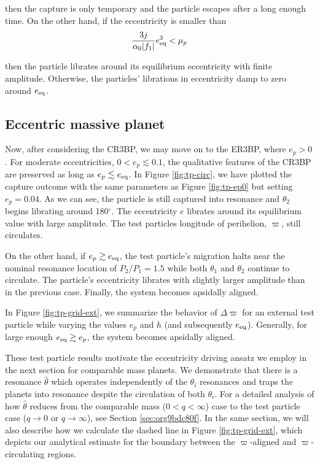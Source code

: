\documentclass[usenatbib,twocolumn]{mnras}
\DeclarePairedDelimiter{\abs}{|}{|}
\begin{document}
\noindent
then the capture is only temporary and the particle escapes after a
long enough time. On the other hand, if the eccentricity is smaller
than
\begin{equation}
  \frac{3j}{\alpha_0 \abs{f_1}}e_{\rm eq}^3 < \mu_p
\end{equation}

\noindent
then the particle librates around its equilibrium eccentricity with
finite amplitude. Otherwise, the particles' librations in eccentricity
damp to zero around \(e_{\rm eq}\).


\subsection{Eccentric massive planet}
\label{sec:orgeb5821c}
Now, after considering the
CR3BP, we may move on to the ER3BP, where \(e_p>0\).  For moderate
eccentricities, \(0<e_p\lesssim 0.1\), the qualitative features of the
CR3BP are preserved as long as \(e_p \lesssim e_{\rm eq}\). In Figure
\ref{fig:tp-circ}, we have plotted the capture outcome with the same
parameters as Figure \ref{fig:tp-ep0} but setting \(e_p = 0.04\). As we
can see, the particle is still captured into resonance and \(\theta_2\)
begins librating around 180\(^\circ\). The eccentricity \(e\) librates
around its equilibrium value with large amplitude. The test particles
longitude of perihelion, \(\varpi\), still circulates.

On the other hand, if \(e_p \gtrsim e_{\rm eq}\), the test particle's
migration halts near the nominal resonance location of \(P_2/P_1=1.5\)
while both \(\theta_1\) and \(\theta_2\) continue to circulate. The particle's
eccentricity librates with slightly larger amplitude than
in the previous case. Finally, the system becomes apsidally aligned.

In Figure \ref{fig:tp-grid-ext}, we summarize the behavior of
\(\Delta\varpi\) for an external test particle while
varying the values \(e_p\) and \(h\) (and subsequently \(e_{\rm
eq}\)). Generally, for large enough \(e_{\rm eq}\gtrsim e_p\), the system
becomes apsidally aligned.

These test particle results motivate the eccentricity driving ansatz
we employ in the next section for comparable mass planets. We
demonstrate that there is a resonance \(\hat\theta\) which operates
independently of the \(\theta_i\) resonances and traps the planets into
resonance despite the circulation of both \(\theta_i\). For a detailed
analysis of how \(\hat\theta\) reduces from the comparable mass
(\(0<q<\infty\)) case to the test particle case (\(q\to0\) or
\(q\to\infty\)), see Section \ref{sec:org9bdc80f}. In the same section,
we will also describe how we calculate the dashed line in Figure
\ref{fig:tp-grid-ext}, which depicts our analytical estimate for the
boundary between the $\varpi$-aligned and $\varpi$-circulating
regions.
\end{document}
